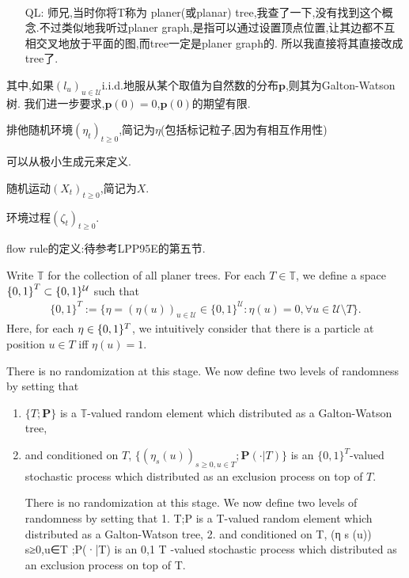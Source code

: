 \documentclass[a4paper,oneside]{ctexbook}
\begin{document}
			\begin{iss}[Open] ~
				\begin{itemize}
					\item[QL:]
					师兄,当时你将T称为 planer(或planar) tree,我查了一下,没有找到这个概念.不过类似地我听过planer graph,是指可以通过设置顶点位置,让其边都不互相交叉地放于平面的图,而tree一定是planer graph的.
					所以我直接将其直接改成tree了.
				\end{itemize}
			\end{iss}

			其中,如果$(l_u)_{u \in \mathcal U}$i.i.d.地服从某个取值为自然数的分布$\mathbf{p}$,则其为Galton-Watson树.
			我们进一步要求,$\mathbf{p}({0})=0$,$\mathbf{p}({0})$的期望有限.

			排他随机环境$(\eta_t)_{t \ge 0}$,简记为$\eta$(包括标记粒子,因为有相互作用性)

			可以从极小生成元来定义.

			随机运动$(X_t)_{t \ge 0}$,简记为$X$.

			环境过程$(\zeta_t)_{t \ge 0}$.

			flow rule的定义:待参考LPP95E的第五节.

			
			Write $\mathbb T$ for the collection of all planer trees.
			For each $T \in \mathbb T$, we define a space ${\{0,1\}}^{T} \subset \mathcal \{0,1\}^{\mathcal U}$ such that
			\begin{align}
			\{0,1\}^{T}:= \{\eta = (\eta(u))_{u \in \mathcal U} \in \{0,1\}^{\mathcal U}: \eta(u) = 0,\forall u \in \mathcal U\setminus T\}.
			\end{align} 
			Here, for each $\eta \in \mathbf \{0,1\}^{T}$, we intuitively consider that there is a particle at position $u \in T$ iff $\eta(u) = 1$.
			
			There is no randomization at this stage. 
			We now define two levels of randomness by setting that 
			\begin{enumerate}
			\item
			$\{T; \mathbf P\}$ is a $\mathbb T$-valued random element which distributed as a Galton-Watson tree,
			\item
			and conditioned on $T$, $\{(\eta_s(u))_{s\geq 0,u \in T}; \mathbf P(\cdot| T)\}$ is an $\{0,1\}^{T}$-valued stochastic process which distributed as an exclusion process on top of $T$.

			There is no randomization at this stage. We now define two levels of randomness by
			setting that
			1. {T;P} is a T-valued random element which distributed as a Galton-Watson tree,
			2. and conditioned on T, {(η s (u)) s≥0,u∈T ;P(·|T)} is an {0,1} T -valued stochastic
			process which distributed as an exclusion process on top of T.
      

\end{enumerate}
	
\end{document}

